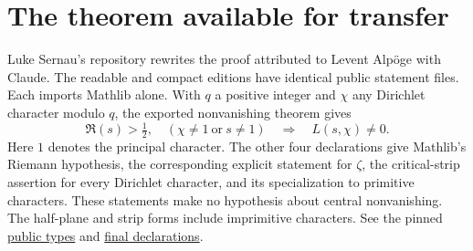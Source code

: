 \section{The theorem available for transfer}
\label{sec:lean-audit}

Luke Sernau's repository rewrites the proof attributed to Levent Alp\"oge with Claude.
The readable and compact editions have identical public statement files. Each imports
Mathlib alone. With $q$ a positive integer and $\chi$ any Dirichlet character modulo $q$,
the exported nonvanishing theorem gives
\[
 \Re(s)>\tfrac12,\quad (\chi\ne 1\ \text{or}\ s\ne1)
 \quad\Longrightarrow\quad L(s,\chi)\ne0 .
\]
Here $1$ denotes the principal character. The other four declarations give
Mathlib's Riemann hypothesis, the corresponding explicit statement for $\zeta$,
the critical-strip assertion for every Dirichlet character, and its specialization
to primitive characters. These statements make no hypothesis about central
nonvanishing. The half-plane and strip forms include imprimitive characters.
See the pinned
\href{https://github.com/lsernau/grh-lean/blob/72fead102f663d5c7a407964a13dc0cf9d977207/grh/src/Statements.lean}{public types}
and \href{https://github.com/lsernau/grh-lean/blob/72fead102f663d5c7a407964a13dc0cf9d977207/grh/src/Main.lean}{final declarations}.

